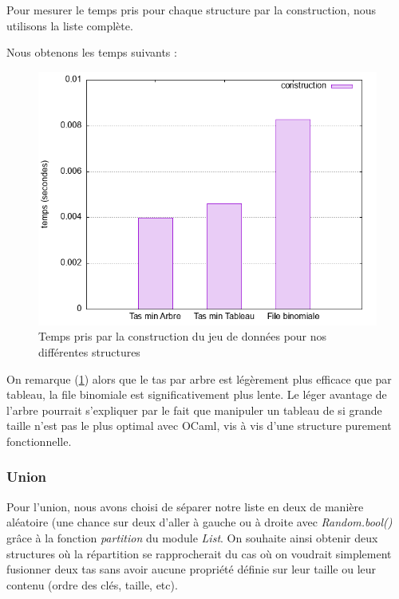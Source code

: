 \documentclass[12pt,a4paper]{article}
\begin{document}
Pour mesurer le temps pris pour chaque structure par la construction, nous utilisons la liste complète.

Nous obtenons les temps suivants :


\begin{figure}[hbtp]
\centering
\includegraphics[scale=0.5]{../Images/svg courbes pour rapport/temps_construction_shakespeare.png}
\caption{Temps pris par la construction du jeu de données pour nos différentes structures}
\label{fig9}
\end{figure}

On remarque (\ref{fig9}) alors que le tas par arbre est légèrement plus efficace que par tableau, la file binomiale est significativement plus lente. Le léger avantage de l'arbre pourrait s'expliquer par le fait que manipuler un tableau de si grande taille n'est pas le plus optimal avec OCaml, vis à vis d'une structure purement fonctionnelle.


\subsubsection{Union}

Pour l'union, nous avons choisi de séparer notre liste en deux de manière aléatoire (une chance sur deux d'aller à gauche ou à droite avec \textit{Random.bool()} grâce à la fonction \textit{partition} du module \textit{List}. On souhaite ainsi obtenir deux structures où la répartition se rapprocherait du cas où on voudrait simplement fusionner deux tas sans avoir aucune propriété définie sur leur taille ou leur contenu (ordre des clés, taille, etc).
\end{document}
